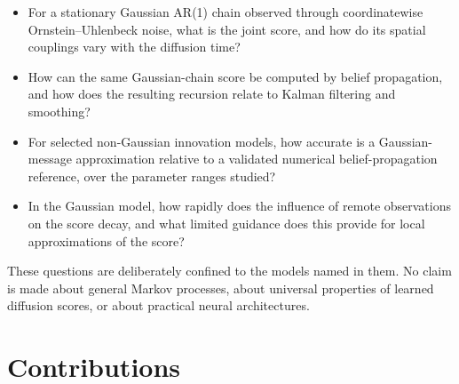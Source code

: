 \begin{itemize}
  \item[\textbf{RQ1.}] For a stationary Gaussian AR(1) chain observed
  through coordinatewise Ornstein--Uhlenbeck noise, what is the joint
  score, and how do its spatial couplings vary with the diffusion time?

  \item[\textbf{RQ2.}] How can the same Gaussian-chain score be computed
  by belief propagation, and how does the resulting recursion relate to
  Kalman filtering and smoothing?

  \item[\textbf{RQ3.}] For selected non-Gaussian innovation models, how
  accurate is a Gaussian-message approximation relative to a validated
  numerical belief-propagation reference, over the parameter ranges
  studied?

  \item[\textbf{RQ4.}] In the Gaussian model, how rapidly does the
  influence of remote observations on the score decay, and what limited
  guidance does this provide for local approximations of the score?
\end{itemize}

These questions are deliberately confined to the models named in them.
No claim is made about general Markov processes, about universal
properties of learned diffusion scores, or about practical neural
architectures.

\section{Contributions}

